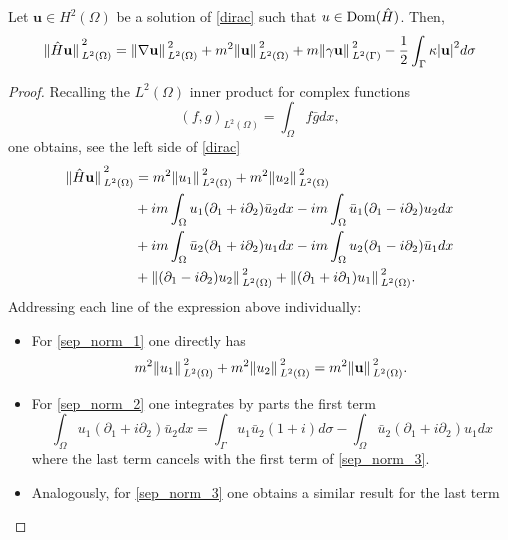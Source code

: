 \begin{lemma}\label{lemma_sep_norm}
    Let \(\mathbf{u} \in H^2(\Omega)\) be a solution of \eqref{dirac} such that \(u \in \operatorname{Dom}(\hat{H})\). Then,
    \begin{equation}\label{sep_norm}
        \norm*{\hat{H}\mathbf{u}}_{L^2(\Omega)}^2 = \norm*{\nabla \mathbf{u} }_{L^2(\Omega)}^2 + m^2 \norm*{\mathbf{u}}_{L^2(\Omega)}^2 + m \norm*{\gamma \mathbf{u}}_{L^2(\Gamma)}^2 -\frac{1}{2}\int_{\Gamma}\kappa \abs{\mathbf{u}}^2 d\sigma
    \end{equation}
\end{lemma}
\begin{proof}
    Recalling the \(L^2(\Omega)\) inner product for complex functions
    \[
    (f, g)_{L^2(\Omega)} = \int_\Omega f \bar{g} dx,
    \]
    one obtains, see the left side of \eqref{dirac}
    \begin{align}
        \norm*{\hat{H}\mathbf{u}}_{L^2(\Omega)}^2 &= m^2 \norm*{u_1}_{L^2(\Omega)}^2 + m^2 \norm*{u_2}_{L^2(\Omega)}^2 \label{sep_norm_1}\\
        & + i m \int_\Omega u_1(\partial_1 + i \partial_2)\bar{u}_2dx - i m \int_\Omega \bar{u}_1(\partial_1 - i \partial_2)u_2 dx \label{sep_norm_2}\\
        & + i m \int_\Omega \bar{u}_2(\partial_1 + i \partial_2)u_1 dx - i m \int_\Omega u_2(\partial_1 - i \partial_2)\bar{u}_1 dx \label{sep_norm_3}\\
        & +\norm*{(\partial_1 - i \partial_2)u_2}_{L^2(\Omega)}^2 + \norm*{(\partial_1 + i \partial_1)u_1}_{L^2(\Omega)}^2. \label{sep_norm_4}
    \end{align}
    Addressing each line of the expression above individually:
    \begin{itemize}
        \item For \eqref{sep_norm_1} one directly has
                \[
                    m^2 \norm*{u_1}_{L^2(\Omega)}^2 + m^2 \norm*{u_2}_{L^2(\Omega)}^2 = m^2 \norm*{\mathbf{u}}_{L^2(\Omega)}^2.
                \]
        \item For \eqref{sep_norm_2} one integrates by parts the first term
                \[
                \int_\Omega u_1(\partial_1 + i \partial_2)\bar{u}_2dx = \int_{\Gamma} u_1\bar{u}_2(1+i)d\sigma - \int_\Omega \bar{u}_2(\partial_1 + i \partial_2)u_1dx
                \]
            where the last term cancels with the first term of \eqref{sep_norm_3}.
        \item Analogously, for \eqref{sep_norm_3} one obtains a similar result for the last term

\end{itemize}
\end{proof}
